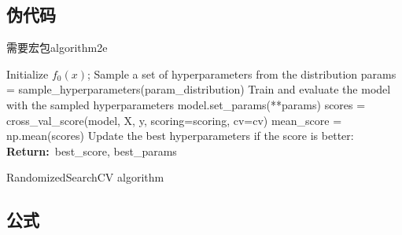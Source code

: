 \documentclass[utf8]{ctexart}
\begin{document}
\subsection{伪代码}
需要宏包algorithm2e

\begin{algorithm}
  Initialize $f_0(x)$;
  {
    Sample a set of hyperparameters from the distribution\;
    \quad params = sample\_hyperparameters(param\_distribution)\;
    Train and evaluate the model with the sampled hyperparameters\;
    \quad model.set\_params(**params)\;
    \quad scores = cross\_val\_score(model, X, y, scoring=scoring, cv=cv)\;
    \quad mean\_score = np.mean(scores)\;
    Update the best hyperparameters if the score is better:
    \textbf{Return:}\ best\_score, best\_params
  }
  \caption{RandomizedSearchCV algorithm}\label{Algorithm 2}
\end{algorithm}

\subsection{公式}
\end{document}
